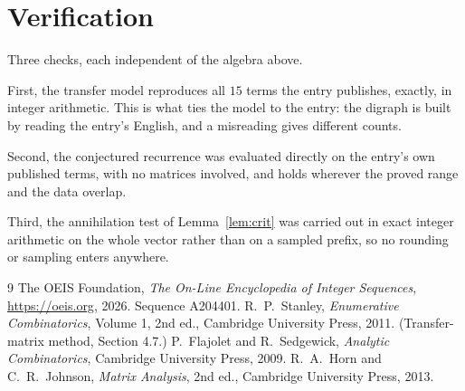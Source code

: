 \documentclass[11pt,a4paper]{article}
\theoremstyle{plain}
\theoremstyle{definition}
\begin{document}
\section{Verification}

Three checks, each independent of the algebra above.

First, the transfer model reproduces all $15$ terms the entry publishes, exactly, in
integer arithmetic. This is what ties the model to the entry: the digraph is built by reading
the entry's English, and a misreading gives different counts.

Second, the conjectured recurrence was evaluated directly on the entry's own published terms,
with no matrices involved, and holds wherever the proved range and the data overlap.

Third, the annihilation test of Lemma~\ref{lem:crit} was carried out in exact integer
arithmetic on the whole vector rather than on a sampled prefix, so no rounding or sampling
enters anywhere.

\begin{thebibliography}{9}
 The OEIS Foundation, \emph{The On-Line Encyclopedia of Integer
Sequences}, \url{https://oeis.org}, 2026. Sequence A204401.
 R.~P.~Stanley, \emph{Enumerative Combinatorics}, Volume 1, 2nd ed.,
Cambridge University Press, 2011. (Transfer-matrix method, Section 4.7.)
 P.~Flajolet and R.~Sedgewick, \emph{Analytic Combinatorics}, Cambridge
University Press, 2009.
 R.~A.~Horn and C.~R.~Johnson, \emph{Matrix Analysis}, 2nd ed., Cambridge
University Press, 2013.
\end{thebibliography}
\end{document}
